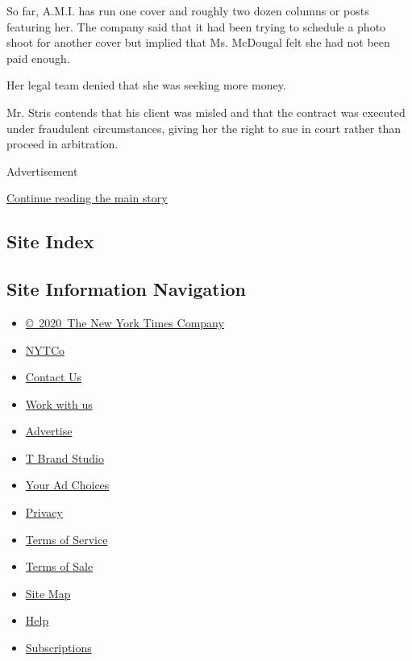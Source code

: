 So far, A.M.I. has run one cover and roughly two dozen columns or posts
featuring her. The company said that it had been trying to schedule a
photo shoot for another cover but implied that Ms. McDougal felt she had
not been paid enough.

Her legal team denied that she was seeking more money.

Mr. Stris contends that his client was misled and that the contract was
executed under fraudulent circumstances, giving her the right to sue in
court rather than proceed in arbitration.

Advertisement

\protect\hyperlink{after-bottom}{Continue reading the main story}

\hypertarget{site-index}{%
\subsection{Site Index}\label{site-index}}

\hypertarget{site-information-navigation}{%
\subsection{Site Information
Navigation}\label{site-information-navigation}}

\begin{itemize}
\tightlist
\item
  \href{https://help.nytimes3xbfgragh.onion/hc/en-us/articles/115014792127-Copyright-notice}{©~2020~The
  New York Times Company}
\end{itemize}

\begin{itemize}
\tightlist
\item
  \href{https://www.nytco.com/}{NYTCo}
\item
  \href{https://help.nytimes3xbfgragh.onion/hc/en-us/articles/115015385887-Contact-Us}{Contact
  Us}
\item
  \href{https://www.nytco.com/careers/}{Work with us}
\item
  \href{https://nytmediakit.com/}{Advertise}
\item
  \href{http://www.tbrandstudio.com/}{T Brand Studio}
\item
  \href{https://www.nytimes3xbfgragh.onion/privacy/cookie-policy\#how-do-i-manage-trackers}{Your
  Ad Choices}
\item
  \href{https://www.nytimes3xbfgragh.onion/privacy}{Privacy}
\item
  \href{https://help.nytimes3xbfgragh.onion/hc/en-us/articles/115014893428-Terms-of-service}{Terms
  of Service}
\item
  \href{https://help.nytimes3xbfgragh.onion/hc/en-us/articles/115014893968-Terms-of-sale}{Terms
  of Sale}
\item
  \href{https://spiderbites.nytimes3xbfgragh.onion}{Site Map}
\item
  \href{https://help.nytimes3xbfgragh.onion/hc/en-us}{Help}
\item
  \href{https://www.nytimes3xbfgragh.onion/subscription?campaignId=37WXW}{Subscriptions}
\end{itemize}
